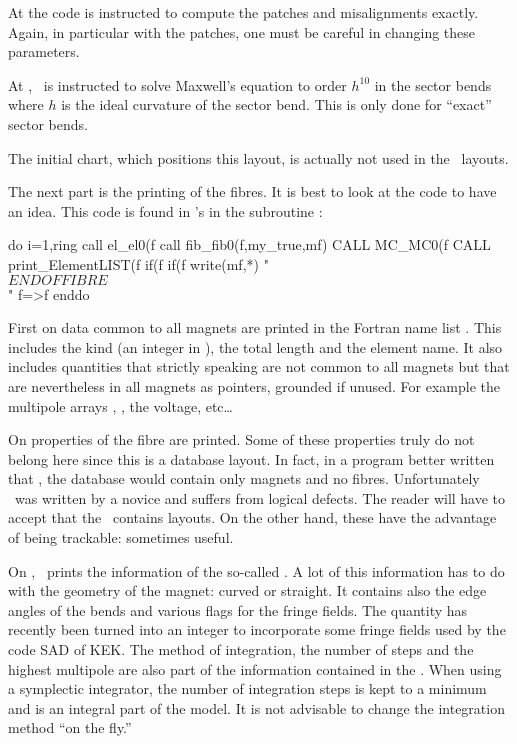 At  the code is instructed to compute the patches and misalignments exactly. Again, in particular with the patches, one must be careful in changing these parameters.

At , \PTC\ is instructed to solve Maxwell's equation to order $h^{10}$ in the sector bends where $h$ is the ideal curvature of the sector bend. This is only done for ``exact'' sector bends. 

The initial chart, which positions this layout, is actually not used in the \DNA\ layouts. 

The next part is the printing of the fibres. It is best to look at the code to have an idea. This code is found in \PTC 's  in the subroutine :

\begin{ptccode}
do i=1,ring%
  call el_el0(f%
  call fib_fib0(f,my_true,mf)    \label{lin:fib:1}
  CALL MC_MC0(f%
  CALL print_ElementLIST(f%
  if(f%
  if(f%
 write(mf,*) " $$$$$$$$$$$$$$$$$ END OF FIBRE $$$$$$$$$$$$$$$$$"
 f=>f%
enddo
\end{ptccode}


First on  data common to all magnets are printed in the Fortran name list .  This includes the kind (an integer in \PTC ), the total length and the element name. It also includes quantities that strictly speaking are not common to all magnets but that are nevertheless in all magnets as  pointers, grounded if unused. For example the multipole arrays ,  , the voltage, etc\ldots


On  properties of the fibre are printed. Some of these properties truly do not belong here since this is a database layout. In fact, in a program better written that \PTC , the database would contain only magnets and no fibres. Unfortunately \PTC\ was written by a novice and suffers from logical defects. The reader will have to accept that the \DNA\ contains layouts. On the other hand, these have the advantage of being trackable: sometimes useful.

 On , \PTC\ prints the information of the so-called . A lot of this information has to do with the geometry of the magnet: curved or straight. It contains also the edge angles of the bends and various flags for the fringe fields. The quantity  has recently been turned into an integer to incorporate some fringe fields used by the code SAD of KEK. The method of integration, the number of steps and the highest multipole are also part of the information contained in the . When using a symplectic integrator, the number of integration steps is kept to a minimum and is an integral part of the model. It is not advisable to change the integration method ``on the fly.''

